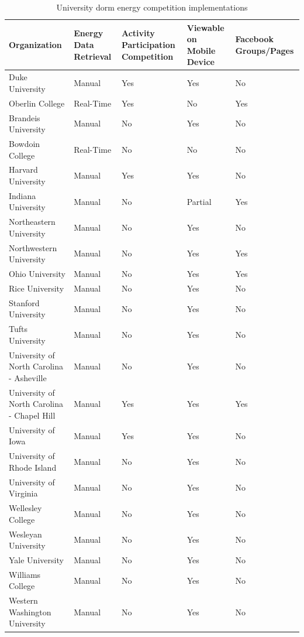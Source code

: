 \begin{table}[h]
	\begin{tabular}{| l || p{2cm} | p{2cm} | p{2cm} | p{2cm} |}
		\hline
		Organization & Energy Data Retrieval & Activity Participation Competition & Viewable on Mobile Device & Facebook Groups/Pages \\
		\hline
		Duke University & Manual & Yes & Yes & No \\
		Oberlin College & Real-Time & Yes & No & Yes\\
		Brandeis University\cite{brandeis} & Manual & No & Yes & No\\
		Bowdoin College\cite{bowdoin} & Real-Time & No & No & No\\
		Harvard University & Manual & Yes & Yes & No\\
		Indiana University\cite{indiana-energychallenge} & Manual & No & Partial & Yes\\
		Northeastern University\cite{northeastern} & Manual & No & Yes & No\\
		Northwestern University\cite{northwestern} & Manual & No & Yes & Yes \\
		Ohio University\cite{ohio-reschallenge} & Manual & No & Yes & Yes\\
		Rice University\cite{rice-sustainability} & Manual & No & Yes & No\\
		Stanford University\cite{stanford-energybowl} & Manual & No & Yes & No \\
		Tufts University\cite{tufts-competition} & Manual & No & Yes & No \\
		University of North Carolina - Asheville\cite{unc-asheville} & Manual & No & Yes & No \\
		University of North Carolina - Chapel Hill\cite{unc-chapelhill} & Manual & Yes & Yes & Yes \\
		University of Iowa\cite{iowa-sturrier} & Manual & Yes & Yes & No \\
		University of Rhode Island\cite{greenuri} & Manual & No & Yes & No \\
		University of Virginia\cite{virginia} & Manual & No & Yes & No \\
		Wellesley College\cite{wellesley} & Manual & No & Yes & No \\
		Wesleyan University\cite{wesleyan} & Manual & No & Yes & No \\
		Yale University\cite{yale-greencup} & Manual & No & Yes & No \\
		Williams College\cite{williams} & Manual & No & Yes & No \\
		Western Washington University\cite{wwu-goforthegreen} & Manual & No & Yes & No \\
		\hline
	\end{tabular}
	\caption{University dorm energy competition implementations}
	\label{feature-matrix}
\end{table}

